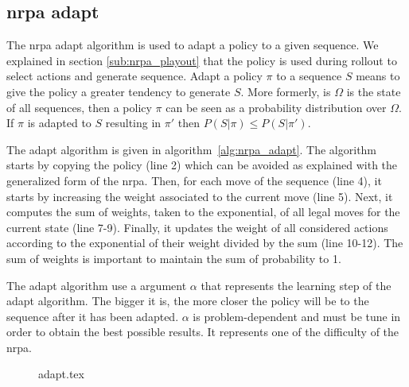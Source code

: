 \subsection{\acrshort{nrpa} adapt}%
\label{sub:nrpa_adapt}

The \gls{nrpa} adapt algorithm is used to adapt a policy to a given sequence.
We explained in section \ref{sub:nrpa_playout} that the policy is used during rollout to select actions and generate sequence.
Adapt a policy \(\pi\) to a sequence \(S\) means to give the policy a greater tendency to generate \(S\).
More formerly, is \(\Omega\) is the state of all sequences, then a policy \(\pi\) can be seen as a probability distribution over \(\Omega\).
If \(\pi\) is adapted to \(S\) resulting in \(\pi'\) then \(P(S|\pi) \leq P(S|\pi')\).

The adapt algorithm is given in algorithm~\ref{alg:nrpa_adapt}.
The algorithm starts by copying the policy (line 2) which can be avoided as explained with the generalized form of the \gls{nrpa}\cite{gnrpa}.
Then, for each move of the sequence (line 4), it starts by increasing the weight associated to the current move (line 5).
Next, it computes the sum of weights, taken to the exponential, of all legal moves for the current state (line 7-9).
Finally, it updates the weight of all considered actions according to the exponential of their weight divided by the sum (line 10-12).
The sum of weights is important to maintain the sum of probability to 1.

The adapt algorithm use a argument \(\alpha\) that represents the learning step of the adapt algorithm.
The bigger it is, the more closer the policy will be to the sequence after it has been adapted.
\(\alpha\) is problem-dependent and must be tune in order to obtain the best possible results.
It represents one of the difficulty of the \gls{nrpa}.

\begin{figure}[htpb]
    \centering
    \begin{minipage}{.7\linewidth}
        {adapt.tex}
    \end{minipage}
\end{figure}

